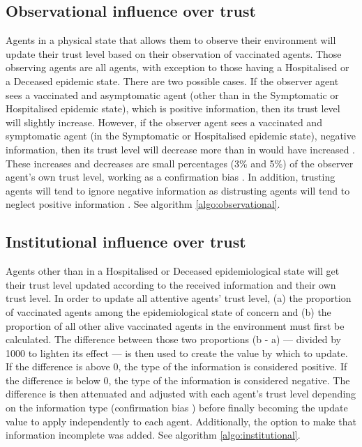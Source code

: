 \subsection{Observational influence over trust}

Agents in a physical state that allows them to observe their environment will update their trust level based on their observation of vaccinated agents. Those observing agents are all agents, with exception to those having a Hospitalised or a Deceased epidemic state. There are two possible cases. If the observer agent sees a vaccinated and asymptomatic agent (other than in the Symptomatic or Hospitalised epidemic state), which is positive information, then its trust level will slightly increase. However, if the observer agent sees a vaccinated and symptomatic agent (in the Symptomatic or Hospitalised epidemic state), negative information, then its trust level will decrease more than in would have increased \cite{cvetkovich_new_2002}. These increases and decreases are small percentages (3\% and 5\%) of the observer agent's own trust level, working as a confirmation bias \cite{nickerson_confirmation_1998}. In addition, trusting agents will tend to ignore negative information as distrusting agents will tend to neglect positive information \cite{cvetkovich_new_2002}. See algorithm \ref{algo:observational}.

\subsection{Institutional influence over trust}
\label{conception_institutional}

Agents other than in a Hospitalised or Deceased epidemiological state will get their trust level updated according to the received information and their own trust level. In order to update all attentive agents' trust level, (a) the proportion of vaccinated agents among the epidemiological state of concern and (b) the proportion of all other alive vaccinated agents in the environment must first be calculated. The difference between those two proportions (b - a) --- divided by 1000 to lighten its effect --- is then used to create the value by which to update. If the difference is above 0, the type of the information is considered positive. If the difference is below 0, the type of the information is considered negative. The difference is then attenuated and adjusted with each agent's trust level depending on the information type (confirmation bias \cite{nickerson_confirmation_1998}) before finally becoming the update value to apply independently to each agent. Additionally, the option to make that information incomplete was added. See algorithm \ref{algo:institutional}.

